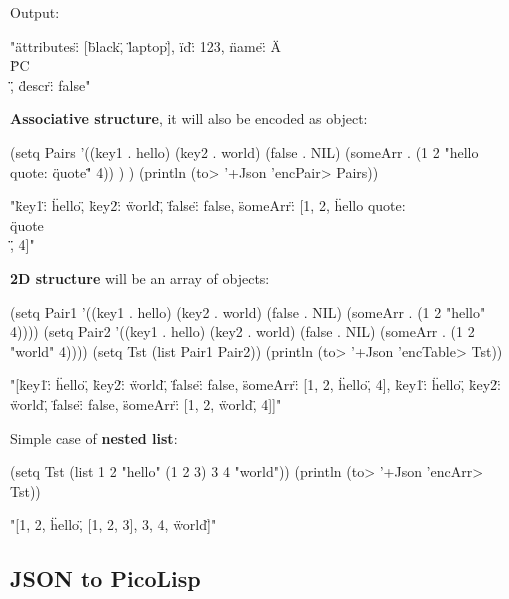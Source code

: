 Output:

\begin{wideverbatim}
  "{\"attributes\": [\"black\", \"laptop\"], \"id\": 123,
    \"name\": \"A \\\"PC\\\"\", \"descr\": false}"
\end{wideverbatim}

\textbf{Associative structure}, it will also be encoded as object:

\begin{wideverbatim}
(setq Pairs '((key1 . hello) (key2 . world) (false . NIL)
              (someArr . (1 2 "hello quote: \"quote\"" 4)) ) )
(println (to> '+Json 'encPair> Pairs))
\end{wideverbatim}


\begin{wideverbatim}
  "{\"key1\": \"hello\", \"key2\": \"world\", \"false\": false,
    \"someArr\": [1, 2, \"hello quote: \\\"quote\\\"\", 4]}"
\end{wideverbatim}

\textbf{2D structure} will be an array of objects:

\begin{wideverbatim}
(setq Pair1 '((key1 . hello) (key2 . world) (false . NIL) (someArr . (1 2 "hello" 4))))
(setq Pair2 '((key1 . hello) (key2 . world) (false . NIL) (someArr . (1 2 "world" 4))))
(setq Tst (list Pair1 Pair2))
(println (to> '+Json 'encTable> Tst))
\end{wideverbatim}


\begin{wideverbatim}
  "[{\"key1\": \"hello\", \"key2\": \"world\", \"false\": false,
    \"someArr\": [1, 2, \"hello\", 4]}, 
  {\"key1\": \"hello\", \"key2\": \"world\", \"false\": false,
    \"someArr\": [1, 2, \"world\", 4]}]"
\end{wideverbatim}

Simple case of \textbf{nested list}:

\begin{wideverbatim}
(setq Tst (list 1 2 "hello" (1 2 3) 3 4 "world"))
(println (to> '+Json 'encArr> Tst))
\end{wideverbatim}


\begin{wideverbatim}
"[1, 2, \"hello\", [1, 2, 3], 3, 4, \"world\"]"
\end{wideverbatim}

\subsection{JSON to PicoLisp}
\label{sec:pl-json-json-to-picolisp}

